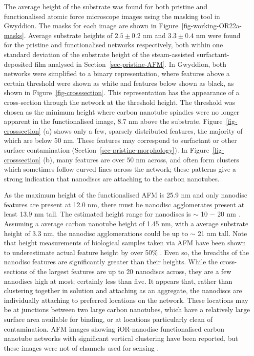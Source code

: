 \documentclass[
  a4paper,
]{scrbook}
\begin{document}
The average height of the substrate was found for both pristine and
functionalised atomic force microscope images using the masking tool in
Gwyddion. The masks for each image are shown in
Figure~\ref{fig-working-OR22a-masks}. Average substrate heights of
\(2.5\pm0.2\) nm and \(3.3\pm0.4\) nm were found for the pristine and
functionalised networks respectively, both within one standard deviation
of the substrate height of the steam-assisted surfactant-deposited film
analysed in Section~\ref{sec-pristine-AFM}. In Gwyddion, both networks
were simplified to a binary representation, where features above a
certain threshold were shown as white and features below shown as black,
as shown in Figure~\ref{fig-crosssection}. This representation has the
appearance of a cross-section through the network at the threshold
height. The threshold was chosen as the minimum height where carbon
nanotube spindles were no longer apparent in the functionalised image,
8.7 nm above the substrate. Figure~\ref{fig-crosssection} (a) shows only
a few, sparsely distributed features, the majority of which are below 50
nm. These features may correspond to surfactant or other surface
contamination (Section~\ref{sec-pristine-morphology}). In
Figure~\ref{fig-crosssection} (b), many features are over 50 nm across,
and often form clusters which sometimes follow curved lines across the
network; these patterns give a strong indication that nanodiscs are
attaching to the carbon nanotubes.

As the maximum height of the functionalised AFM is 25.9 nm and only
nanodisc features are present at 12.0 nm, there must be nanodisc
agglomerates present at least 13.9 nm tall. The estimated height range
for nanodiscs is \(\sim\) 10 \(-\) 20 nm
\autocite{Nath2007,Bayburt2010,Murugathas2020}. Assuming a average
carbon nanotube height of 1.45 nm, with a average substrate height of
3.3 nm, the nanodisc agglomerations could be up to \(\sim\) 21 nm tall.
Note that height measurements of biological samples taken via AFM have
been shown to underestimate actual feature height by over 50\%
\autocite{Vobornik2023}. Even so, the breadths of the nanodisc features
are significantly greater than their heights. While the cross-sections
of the largest features are up to 20 nanodiscs across, they are a few
nanodiscs high at most; certainly less than five. It appears that,
rather than clustering together in solution and attaching as an
aggregate, the nanodiscs are individually attaching to preferred
locations on the network. These locations may be at junctions between
two large carbon nanotubes, which have a relatively large surface area
available for binding, or at locations particularly clean of
contamination. AFM images showing iOR-nanodisc functionalised carbon
nanotube networks with significant vertical clustering have been
reported, but these images were not of channels used for sensing
\autocite{Murugathas2019b}.
\end{document}
